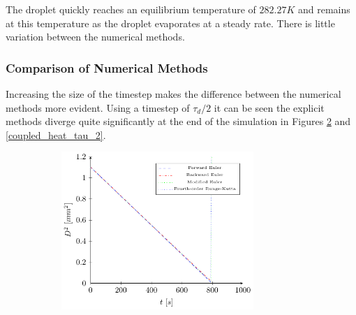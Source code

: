 \documentclass[../Interim_Report_Master]{subfiles}
\begin{document}
The droplet quickly reaches an equilibrium temperature of $282.27K$ and remains at this temperature as the droplet evaporates at a steady rate. There is little variation between the numerical methods.

\subsubsection{Comparison of Numerical Methods}
Increasing the size of the timestep makes the difference between the numerical methods more evident. Using a timestep of $\tau_d/2$ it can be seen the explicit methods diverge quite significantly at the end of the simulation in Figures \ref{coupled_d2_tau_2} and \ref{coupled_heat_tau_2}. 
\begin{figure}[H]
	\centering
	\begin{subfigure}{\textwidth}
		\centering
		\includegraphics[width=0.8\textwidth]{./Diagrams/Coupled_Heat_Mass_Transfer_tau_2/Coupled_d2_Transfer_tau_2.pdf}
		\caption{}
		\label{coupled_d2_tau_2}
	\end{subfigure}
\end{figure}
\end{document}
